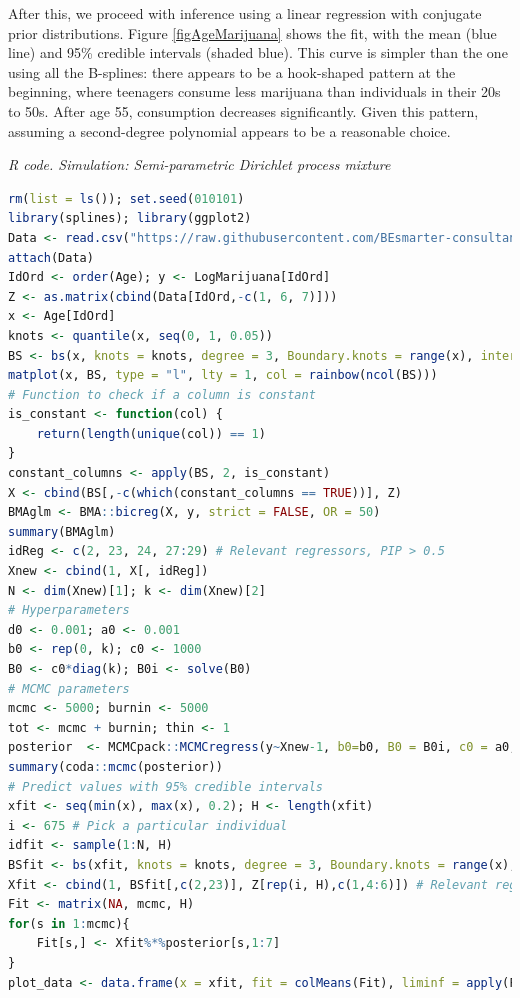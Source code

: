 \begin{enumerate}[leftmargin=*]
After this, we proceed with inference using a linear regression with conjugate prior distributions. Figure \ref{figAgeMarijuana} shows the fit, with the mean (blue line) and 95\% credible intervals (shaded blue). This curve is simpler than the one using all the B-splines: there appears to be a hook-shaped pattern at the beginning, where teenagers consume less marijuana than individuals in their 20s to 50s. After age 55, consumption decreases significantly. Given this pattern, assuming a second-degree polynomial appears to be a reasonable choice.

\begin{tcolorbox}[enhanced,width=4.67in,center upper,
	fontupper=\large\bfseries,drop shadow southwest,sharp corners]
	\textit{R code. Simulation: Semi-parametric Dirichlet process mixture}
	\begin{VF}
		\begin{lstlisting}[language=R]
rm(list = ls()); set.seed(010101) 
library(splines); library(ggplot2)
Data <- read.csv("https://raw.githubusercontent.com/BEsmarter-consultancy/BSTApp/refs/heads/master/DataApp/MarijuanaColombia.csv")
attach(Data)
IdOrd <- order(Age); y <- LogMarijuana[IdOrd]
Z <- as.matrix(cbind(Data[IdOrd,-c(1, 6, 7)]))
x <- Age[IdOrd] 
knots <- quantile(x, seq(0, 1, 0.05))
BS <- bs(x, knots = knots, degree = 3, Boundary.knots = range(x), intercept = FALSE)
matplot(x, BS, type = "l", lty = 1, col = rainbow(ncol(BS)))
# Function to check if a column is constant
is_constant <- function(col) {
	return(length(unique(col)) == 1)
}
constant_columns <- apply(BS, 2, is_constant)
X <- cbind(BS[,-c(which(constant_columns == TRUE))], Z)
BMAglm <- BMA::bicreg(X, y, strict = FALSE, OR = 50) 
summary(BMAglm)
idReg <- c(2, 23, 24, 27:29) # Relevant regressors, PIP > 0.5
Xnew <- cbind(1, X[, idReg])
N <- dim(Xnew)[1]; k <- dim(Xnew)[2]
# Hyperparameters
d0 <- 0.001; a0 <- 0.001
b0 <- rep(0, k); c0 <- 1000
B0 <- c0*diag(k); B0i <- solve(B0)
# MCMC parameters
mcmc <- 5000; burnin <- 5000
tot <- mcmc + burnin; thin <- 1
posterior  <- MCMCpack::MCMCregress(y~Xnew-1, b0=b0, B0 = B0i, c0 = a0, d0 = d0, burnin = burnin, mcmc = mcmc, thin = thin)
summary(coda::mcmc(posterior))
# Predict values with 95% credible intervals
xfit <- seq(min(x), max(x), 0.2); H <- length(xfit)
i <- 675 # Pick a particular individual
idfit <- sample(1:N, H)
BSfit <- bs(xfit, knots = knots, degree = 3, Boundary.knots = range(x), intercept = FALSE)
Xfit <- cbind(1, BSfit[,c(2,23)], Z[rep(i, H),c(1,4:6)]) # Relevant regressors, PIP > 0.5
Fit <- matrix(NA, mcmc, H)
for(s in 1:mcmc){
	Fit[s,] <- Xfit%*%posterior[s,1:7]
}
plot_data <- data.frame(x = xfit, fit = colMeans(Fit), liminf = apply(Fit, 2, quantile, 0.025), limsup = apply(Fit, 2, quantile, 0.975))


\end{lstlisting}
\end{VF}
\end{tcolorbox}
\end{enumerate}

